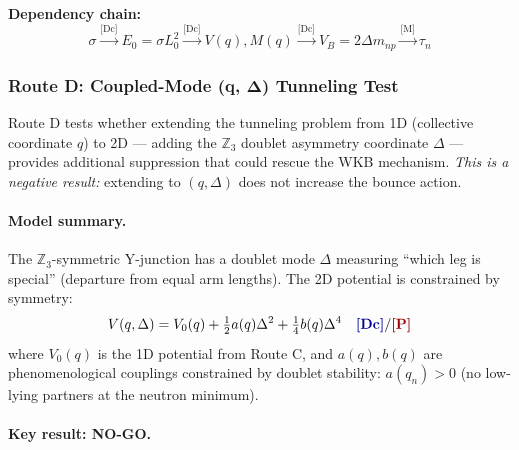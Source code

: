 \begin{tcolorbox}[colback=gray!5!white, colframe=gray!60!black,
                  title={\textbf{Parameter Provenance Table (Route C)}}]
\textbf{Dependency chain:}
\[
\sigma \xrightarrow{\text{[Dc]}} E_0 = \sigma L_0^2 \xrightarrow{\text{[Dc]}} V(q), M(q)
\xrightarrow{\text{[Dc]}} V_B = 2\Delta m_{np} \xrightarrow{\text{[M]}} \tau_n
\]
\end{tcolorbox}


\subsubsection{Route D: Coupled-Mode (q, Δ) Tunneling Test}
\label{subsec:routeD_2D_bounce}

Route D tests whether extending the tunneling problem from 1D (collective coordinate $q$)
to 2D --- adding the $\mathbb{Z}_3$ doublet asymmetry coordinate $\Delta$ --- provides
additional suppression that could rescue the WKB mechanism.
\emph{This is a negative result:} extending to $(q,\Delta)$ does not increase the bounce action.

\paragraph{Model summary.}
The $\mathbb{Z}_3$-symmetric Y-junction has a doublet mode $\Delta$ measuring ``which leg
is special'' (departure from equal arm lengths). The 2D potential is constrained by symmetry:
\begin{equation}
V(q, \Delta) = V_0(q) + \tfrac{1}{2} a(q) \Delta^2 + \tfrac{1}{4} b(q) \Delta^4
\quad \text{\tagDc{}/\tagP{}}
\label{eq:routeD_potential}
\end{equation}
where $V_0(q)$ is the 1D potential from Route C, and $a(q), b(q)$ are phenomenological
couplings constrained by doublet stability: $a(q_n) > 0$ (no low-lying partners at the
neutron minimum).

\paragraph{Key result: NO-GO.}

